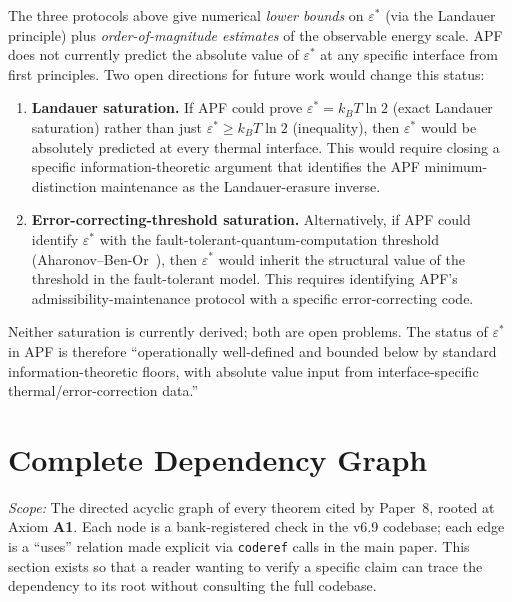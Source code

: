 \documentclass[11pt]{article}
\theoremstyle{plain}
\theoremstyle{definition}
\theoremstyle{remark}
\newcommand{\Aone}{\textbf{A1}}
\begin{document}
The three protocols above give numerical \emph{lower bounds} on $\varepsilon^*$ (via the Landauer principle) plus \emph{order-of-magnitude estimates} of the observable energy scale.  APF does not currently predict the absolute value of $\varepsilon^*$ at any specific interface from first principles.  Two open directions for future work would change this status:

\begin{enumerate}[leftmargin=2em,itemsep=3pt]
  \item \textbf{Landauer saturation.}  If APF could prove $\varepsilon^* = k_B T \ln 2$ (exact Landauer saturation) rather than just $\varepsilon^* \geq k_B T \ln 2$ (inequality), then $\varepsilon^*$ would be absolutely predicted at every thermal interface.  This would require closing a specific information-theoretic argument that identifies the APF minimum-distinction maintenance as the Landauer-erasure inverse.
  \item \textbf{Error-correcting-threshold saturation.}  Alternatively, if APF could identify $\varepsilon^*$ with the fault-tolerant-quantum-computation threshold (Aharonov--Ben-Or~\cite{AharonovBenOr2008}), then $\varepsilon^*$ would inherit the structural value of the threshold in the fault-tolerant model.  This requires identifying APF's admissibility-maintenance protocol with a specific error-correcting code.
\end{enumerate}

Neither saturation is currently derived; both are open problems.  The status of $\varepsilon^*$ in APF is therefore ``operationally well-defined and bounded below by standard information-theoretic floors, with absolute value input from interface-specific thermal/error-correction data.''

\section{Complete Dependency Graph}\label{supp:B}

\noindent\textit{Scope:} The directed acyclic graph of every theorem cited by Paper~8, rooted at Axiom \Aone{}.  Each node is a bank-registered check in the v6.9 codebase; each edge is a ``uses'' relation made explicit via \texttt{coderef} calls in the main paper.  This section exists so that a reader wanting to verify a specific claim can trace the dependency to its root without consulting the full codebase.
\end{document}
